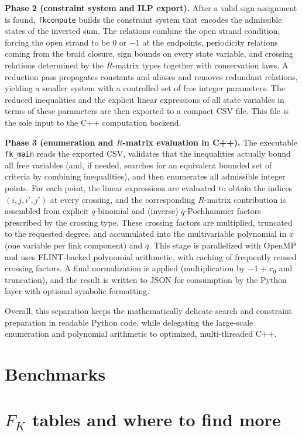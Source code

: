 \documentclass[twocolumn]{article}
\begin{document}
\noindent\textbf{Phase 2 (constraint system and ILP export).} 
After a valid sign assignment is found, \texttt{fkcompute} builds the constraint system that encodes the admissible states of the inverted sum.
The relations combine the open strand condition, forcing the open strand to be $0$ or $-1$ at the endpoints, periodicity relations coming from the braid closure, sign bounds on every state variable, and crossing relations determined by the $R$-matrix types together with conservation laws.
A reduction pass propagates constants and aliases and removes redundant relations, yielding a smaller system with a controlled set of free integer parameters. 
The reduced inequalities and the explicit linear expressions of all state variables in terms of these parameters are then exported to a compact CSV file.
This file is the sole input to the C++ computation backend.

\noindent\textbf{Phase 3 (enumeration and $R$-matrix evaluation in C++).} 
The executable \texttt{fk\_main} reads the exported CSV, validates that the inequalities actually bound all free variables (and, if needed, searches for an equivalent bounded set of criteria by combining inequalities), and then enumerates all admissible integer points. 
For each point, the linear expressions are evaluated to obtain the indices $(i,j,i',j')$ at every crossing, and the corresponding $R$-matrix contribution is assembled from explicit $q$-binomial and (inverse) $q$-Pochhammer factors prescribed by the crossing type.
These crossing factors are multiplied, truncated to the requested degree, and accumulated into the multivariable polynomial in $x$ (one variable per link component) and $q$.
This stage is parallelized with OpenMP and uses FLINT-backed polynomial arithmetic, with caching of frequently reused crossing factors. 
A final normalization is applied (multiplication by $-1+x_0$ and truncation), and the result is written to JSON for consumption by the Python layer with optional symbolic formatting.

Overall, this separation keeps the mathematically delicate search and constraint preparation in readable Python code, while delegating the large-scale enumeration and polynomial arithmetic to optimized, multi-threaded C++.

\section{Benchmarks}
\section{$F_K$ tables and where to find more}



\end{document}
